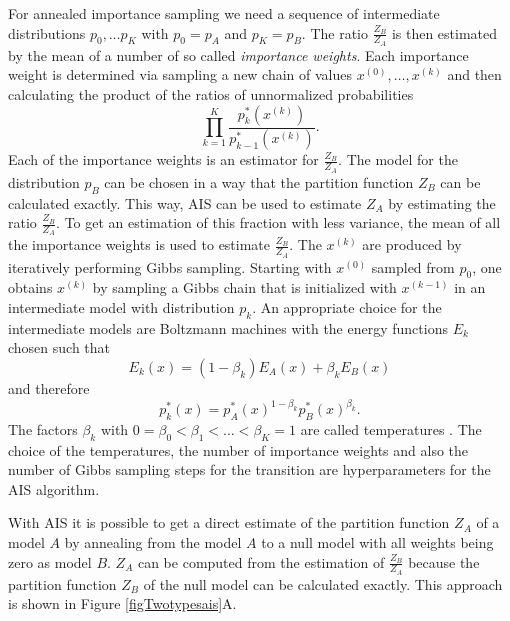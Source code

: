 \documentclass[12pt]{article}
\begin{document}
For annealed importance sampling we need a sequence of intermediate distributions
$p_0, \dots p_K$ with
$p_0 = p_A$ and $p_K = p_B$. The ratio $\frac{Z_B}{Z_A}$ is then estimated by the mean of a number of so called {\em importance weights}.
Each importance weight is determined via sampling a new chain of values $x^{(0)}, \dots, x^{(k)}$ and then calculating the product of the ratios of unnormalized probabilities
\[
   \prod_{k=1}^K \frac{p^*_k(x^{(k)})}{p^*_{k-1}(x^{(k)})}.
\]
Each of the importance weights is an estimator for $\frac{Z_B}{Z_A}$.
The model for the distribution $p_B$ can be chosen in a way that the partition function $Z_B$ can be calculated exactly.
This way, AIS can be used to estimate $Z_A$ by estimating the ratio $\frac{Z_B}{Z_A}$.
To get an estimation of this fraction with less variance, the mean of all the importance weights is used to estimate  $\frac{Z_B}{Z_A}$.
The $x^{(k)}$ are produced by iteratively performing Gibbs sampling. Starting with $x^{(0)}$ sampled from $p_0$, one obtains $x^{(k)}$ by sampling a Gibbs chain that is initialized with $x^{(k-1)}$ in an intermediate model with distribution $p_k$. An appropriate choice for the intermediate models are Boltzmann machines with the energy functions $E_k$ chosen such that
\[
   E_k(x) = (1 - \beta_k) E_A(x) + \beta_k E_B(x)
\]
and therefore
\[
   p_k^*(x) = p_A^*(x)^{1-\beta_k} p_B^*(x)^{\beta_k}.
\]
The factors $\beta_k$ with $0 = \beta_0 < \beta_1 < ... < \beta_K = 1$ are called temperatures \citep{salakhutdinov2008learning}.
The choice of the temperatures, the number of importance weights and also the number of Gibbs sampling steps for the transition are hyperparameters for the AIS algorithm.

With AIS it is possible to get a direct estimate of the partition function $Z_A$ of a model $A$ by annealing from the model $A$ to a null model with all weights being zero as model $B$.
$Z_A$ can be computed from the estimation of $\frac{Z_B}{Z_A}$ because the partition function $Z_B$ of the null model can be calculated exactly. This approach is shown in Figure \ref{figTwotypesais}A.
\end{document}
